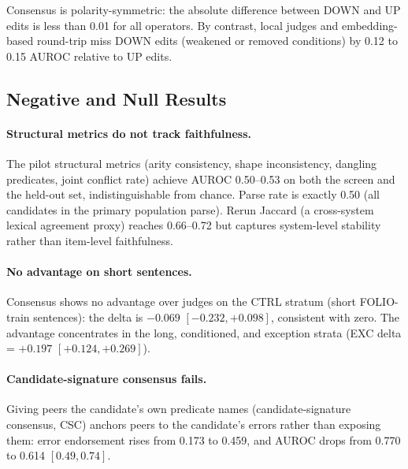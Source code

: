 \documentclass[11pt,letterpaper]{article}
\begin{document}
Consensus is polarity-symmetric: the absolute difference between DOWN and UP edits is less than 0.01 for all operators. By contrast, local judges and embedding-based round-trip miss DOWN edits (weakened or removed conditions) by 0.12 to 0.15 AUROC relative to UP edits.

\subsection{Negative and Null Results}

\paragraph{Structural metrics do not track faithfulness.}
The pilot structural metrics (arity consistency, shape inconsistency, dangling predicates, joint conflict rate) achieve AUROC 0.50--0.53 on both the screen and the held-out set, indistinguishable from chance. Parse rate is exactly 0.50 (all candidates in the primary population parse). Rerun Jaccard (a cross-system lexical agreement proxy) reaches 0.66--0.72 but captures system-level stability rather than item-level faithfulness.

\paragraph{No advantage on short sentences.}
Consensus shows no advantage over judges on the CTRL stratum (short FOLIO-train sentences): the delta is $-0.069$ $[-0.232, +0.098]$, consistent with zero. The advantage concentrates in the long, conditioned, and exception strata (EXC delta = $+0.197$ $[+0.124, +0.269]$).

\paragraph{Candidate-signature consensus fails.}
Giving peers the candidate's own predicate names (candidate-signature consensus, CSC) anchors peers to the candidate's errors rather than exposing them: error endorsement rises from 0.173 to 0.459, and AUROC drops from 0.770 to 0.614 $[0.49, 0.74]$.
\end{document}
